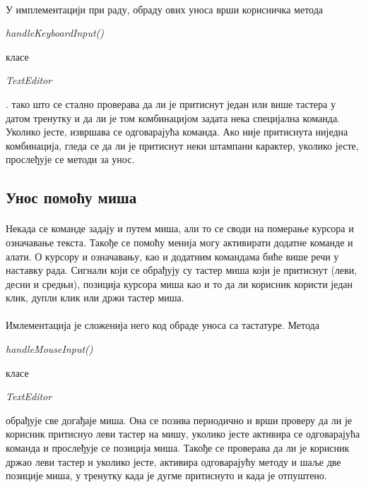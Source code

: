 \documentclass[12pt,oneside]{memoir}
\begin{document}
\paragraph{}
У имплементацији при раду, обраду ових уноса врши корисничка метода \begin{latinica}\textit{handleKeyboardInput()}\end{latinica} класе
\begin{latinica}\textit{TextEditor}\end{latinica}.
 тако што се стално проверава да ли
је притиснут један или више тастера у датом тренутку и да ли је том комбинацијом 
задата нека специјална команда. Уколико јесте, извршава се одговарајућа команда. Ако
није притиснута ниједна комбинација, гледа се да ли је притиснут неки штампани карактер,
уколико јесте, прослеђује се методи за унос.


\subsection{Унос помоћу миша}
\paragraph{} 
Некада се команде задају и путем миша, али то се своди на померање курсора и означавање
текста. Такође се помоћу менија могу активирати додатне команде и алати.
О курсору и означавању, као и додатним командама биће више речи у наставку рада.
Сигнали који се обрађују су тастер миша који је притиснут (леви, десни и средњи),
позиција курсора миша као и то да ли корисник користи један клик, дупли клик или
држи тастер миша.

\paragraph{}
Имлементација је сложенија него код обраде уноса са тастатуре. Метода
\begin{latinica}\textit{handleMouseInput()}\end{latinica}
класе \begin{latinica}\textit{TextEditor}\end{latinica} обрађује све догађаје
миша. Она се позива периодично и врши проверу да ли је корисник притиснуо леви тастер на мишу, уколико јесте активира се одговарајућа
команда и прослеђује се позиција миша. Такође се проверава да ли је корисник држао
леви тастер и уколико јесте, активира одговарајућу методу и шаље две позиције миша,
у тренутку када је дугме притиснуто и када је отпуштено.
\end{document}
